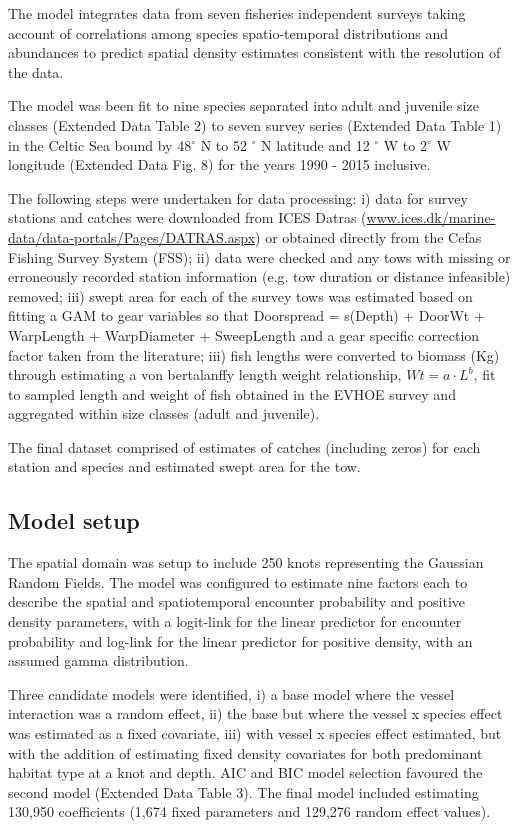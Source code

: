 \documentclass{nature}
\begin{document}
\begin{linenumbers}
The model integrates data from seven fisheries independent surveys taking
account of correlations among species spatio-temporal distributions and
abundances to predict spatial density estimates consistent with the resolution
of the data. 

The model was been fit to nine species separated into adult and juvenile size
classes (Extended Data Table 2) to seven survey series (Extended Data Table 1)
in the Celtic Sea bound by 48$^{\circ}$ N to 52 $^{\circ}$ N latitude and 12
$^{\circ}$ W to 2$^{\circ}$ W longitude (Extended Data Fig. 8) for the years
1990 - 2015 inclusive. 

The following steps were undertaken for data processing: i) data for survey
stations and catches were downloaded from ICES Datras
(\url{www.ices.dk/marine-data/data-portals/Pages/DATRAS.aspx}) or obtained
directly from the Cefas Fishing Survey System (FSS); ii) data were checked and
any tows with missing or erroneously recorded station information (e.g. tow
duration or distance infeasible) removed; iii) swept area for each of the
survey tows was estimated based on fitting a GAM to gear variables so that
Doorspread = s(Depth) + DoorWt + WarpLength + WarpDiameter + SweepLength and a
gear specific correction factor taken from the literature\cite{Piet2009}; iii)
fish lengths were converted to biomass (Kg) through estimating a von
bertalanffy length weight relationship, $Wt = a \cdot L^{b}$, fit to sampled
length and weight of fish obtained in the EVHOE survey and aggregated within
size classes (adult and juvenile). 

The final dataset comprised of estimates of catches (including zeros) for each
station and species and estimated swept area for the tow.

\subsection{Model setup}

The spatial domain was setup to include 250 knots representing the Gaussian
Random Fields. The model was configured to estimate nine factors each to describe
the spatial and spatiotemporal encounter probability and positive density
parameters, with a logit-link for the linear predictor for encounter
probability and log-link for the linear predictor for positive density, with an
assumed gamma distribution.

Three candidate models were identified, i) a base model where the vessel
interaction was a random effect, ii) the base but where the vessel x species
effect was estimated as a fixed covariate, iii) with vessel x species effect
estimated, but with the addition of estimating fixed density covariates for
both predominant habitat type at a knot and depth. AIC and BIC model selection
favoured the second model (Extended Data Table 3). The final model included
estimating 130,950 coefficients (1,674 fixed parameters and 129,276 random
effect values).


\end{linenumbers}
\end{document}
